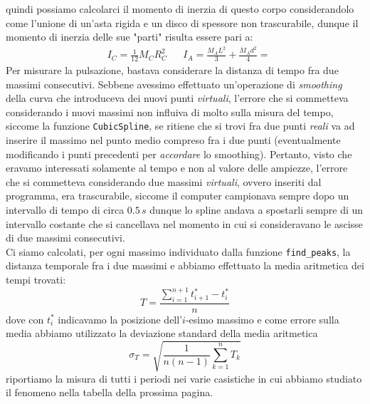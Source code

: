 \documentclass{article}
\begin{document}
\noindent quindi possiamo calcolarci il momento di inerzia di questo corpo considerandolo come l'unione di un'asta rigida e un disco di spessore non trascurabile, dunque il momento di inerzia delle sue "parti" risulta essere pari a:
\begin{align*}
	&I_C = \frac{1}{12} M_C R^2_C & &I_A = \frac{M_A L^2}{3} + \frac{M_A d^2}{4} = 
\end{align*}
Per misurare la pulsazione, bastava considerare la distanza di tempo fra due massimi consecutivi. Sebbene avessimo effettuato un'operazione di \emph{smoothing} della curva che introduceva dei nuovi punti \emph{virtuali}, l'errore che si commetteva considerando i nuovi massimi non influiva di molto sulla misura del tempo, siccome la funzione \texttt{CubicSpline}, se ritiene che si trovi fra due punti \emph{reali} va ad inserire il massimo nel punto medio compreso fra i due punti (eventualmente modificando i punti precedenti per \emph{accordare} lo smoothing). Pertanto, visto che eravamo interessati solamente al tempo e non al valore delle ampiezze, l'errore che si commetteva considerando due massimi \emph{virtuali}, ovvero inseriti dal programma, era trascurabile, siccome il computer campionava sempre dopo un intervallo di tempo di circa $0.5 \, s$ dunque lo spline andava a spostarli sempre di un intervallo costante che si cancellava nel momento in cui si consideravano le ascisse di due massimi consecutivi. \\
Ci siamo calcolati, per ogni massimo individuato dalla funzione \texttt{find\_peaks}, la distanza temporale fra i due massimi e abbiamo effettuato la media aritmetica dei tempi trovati:
\begin{equation}
	T = \frac{\sum\limits_{i=1}^{n+1} t^{*}_{i+1} - t^{*}_i}{n}
\end{equation}
dove con $t^{*}_{i}$ indicavamo la posizione dell'$i$-esimo massimo e come errore sulla media abbiamo utilizzato la deviazione standard della media aritmetica
\begin{equation}
	\sigma_{T} = \sqrt{\frac{1}{n(n-1)}\sum_{k=1}^{n}{T_k}}
\end{equation}
riportiamo la misura di tutti i periodi nei varie casistiche in cui abbiamo studiato il fenomeno nella tabella della prossima pagina.
\end{document}
